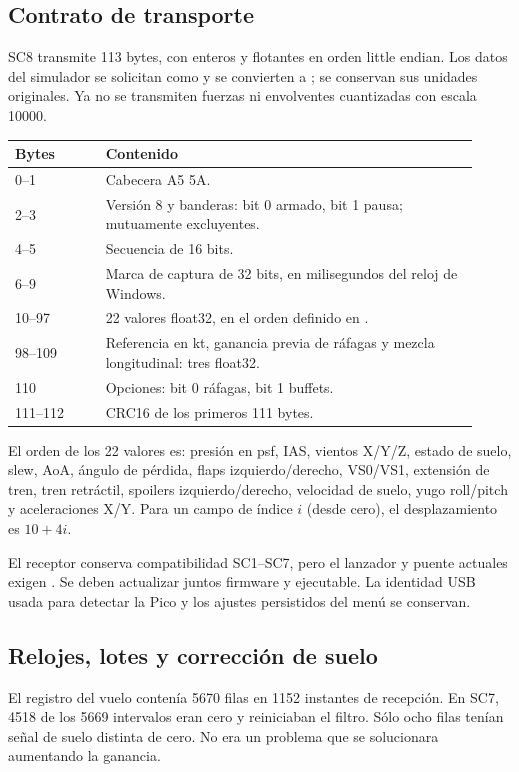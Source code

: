 \documentclass[11pt,a4paper]{article}
\newcommand{\code}[1]{\texttt{\detokenize{#1}}}
\begin{document}
\subsection{Contrato de transporte}
SC8 transmite 113 bytes, con enteros y flotantes en orden little endian. Los datos del simulador se solicitan como \code{FLOAT64} y se convierten a \code{float32}; se conservan sus unidades originales. Ya no se transmiten fuerzas ni envolventes cuantizadas con escala 10000.
\begin{longtable}{p{0.18\linewidth}p{0.74\linewidth}}
\toprule Bytes & Contenido\\\midrule\endhead
0--1 & Cabecera A5 5A.\\
2--3 & Versión 8 y banderas: bit 0 armado, bit 1 pausa; mutuamente excluyentes.\\
4--5 & Secuencia de 16 bits.\\
6--9 & Marca de captura de 32 bits, en milisegundos del reloj de Windows.\\
10--97 & 22 valores float32, en el orden definido en \code{RawTelemetry.h}.\\
98--109 & Referencia en kt, ganancia previa de ráfagas y mezcla longitudinal: tres float32.\\
110 & Opciones: bit 0 ráfagas, bit 1 buffets.\\
111--112 & CRC16 de los primeros 111 bytes.\\\bottomrule
\end{longtable}
El orden de los 22 valores es: presión en psf, IAS, vientos X/Y/Z, estado de suelo, slew, AoA, ángulo de pérdida, flaps izquierdo/derecho, VS0/VS1, extensión de tren, tren retráctil, spoilers izquierdo/derecho, velocidad de suelo, yugo roll/pitch y aceleraciones X/Y. Para un campo de índice $i$ (desde cero), el desplazamiento es $10+4i$.

El receptor conserva compatibilidad SC1--SC7, pero el lanzador y puente actuales exigen \code{YOKE17SC8}. Se deben actualizar juntos firmware y ejecutable. La identidad USB usada para detectar la Pico y los ajustes persistidos del menú se conservan.

\subsection{Relojes, lotes y corrección de suelo}
El registro del vuelo contenía 5670 filas en 1152 instantes de recepción. En SC7, 4518 de los 5669 intervalos eran cero y reiniciaban el filtro. Sólo ocho filas tenían señal de suelo distinta de cero. No era un problema que se solucionara aumentando la ganancia.
\end{document}
